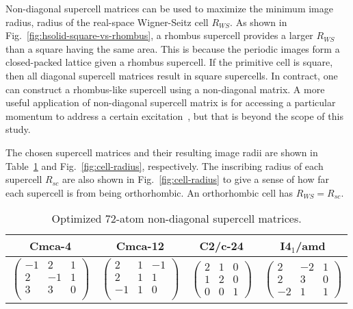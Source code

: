 Non-diagonal supercell matrices can be used to maximize the minimum image radius, radius of the real-space Wigner-Seitz cell $R_{WS}$.
As shown in Fig.~\ref{fig:hsolid-square-vs-rhombus}, a rhombus supercell provides a larger $R_{WS}$ than a square having the same area.
This is because the periodic images form a closed-packed lattice given a rhombus supercell.
If the primitive cell is square, then all diagonal supercell matrices result in square supercells. In contract, one can construct a rhombus-like supercell using a non-diagonal matrix.
A more useful application of non-diagonal supercell matrix is for accessing a particular momentum to address a certain excitation~\cite{Lloyd-Williams2015}, but that is beyond the scope of this study.

The chosen supercell matrices and their resulting image radii are shown in Table~\ref{tab:hsolid-tmat72} and Fig.~\ref{fig:cell-radius}, respectively.
The inscribing radius of each supercell $R_{sc}$ are also shown in Fig.~\ref{fig:cell-radius} to give a sense of how far each supercell is from being orthorhombic. An orthorhombic cell has $R_{WS} = R_{sc}$.
\begin{table}[h]
	\centering
	\caption{Optimized 72-atom non-diagonal supercell matrices.}
	\label{tab:hsolid-tmat72}
	\begin{tabular}{cccc}
		\hline\hline
		Cmca-4 & Cmca-12 & C2/c-24 & I4$_1$/amd \\
		\hline
		$\left(\begin{array}{rrr}
		-1 &  2 &  1 \\
		2 & -1 &  1 \\
		3 &  3 &  0 \\
		\end{array}\right)$ & $\left(\begin{array}{rrr}
		2 &  1 &  -1 \\
		2 &  1 &   1 \\
		-1 &  1 &  0 \\
		\end{array}\right)$ & $\left(\begin{array}{rrr}
		2 &  1 &  0 \\
		1 &  2 &  0 \\
		0 &  0 &  1
		\end{array}\right)$ & $\left(\begin{array}{rrr}
		2 & -2 &  1 \\
		2 &  3 &  0 \\
		-2 &  1 &  1
		\end{array}\right)$ \\
		\hline\hline
	\end{tabular}
\end{table}

